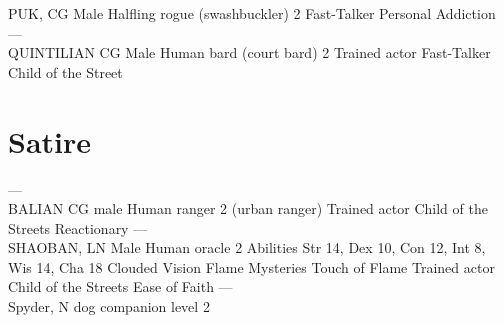 PUK, CG Male Halfling rogue (swashbuckler) 2                 Fast-Talker  Personal Addiction ---\\

QUINTILIAN CG Male Human bard (court bard) 2                    Trained actor  Fast-Talker  Child of the Street \section{Satire}

---\\

BALIAN CG male Human ranger 2 (urban ranger)               Trained actor  Child of the Streets  Reactionary ---\\

SHAOBAN, LN Male Human oracle 2           Abilities Str 14, Dex 10, Con 12, Int 8, Wis 14, Cha 18   Clouded Vision  Flame Mysteries  Touch of Flame  Trained actor  Child of the Streets  Ease of Faith ---\\

Spyder, N dog companion level 2            